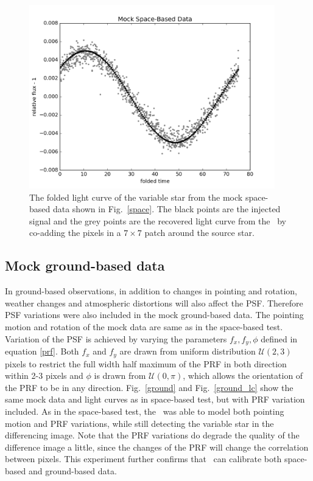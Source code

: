 \begin{figure}[p]
\begin{center}
\includegraphics[width=0.95\textwidth]{figures/cdi/f2a}
\end{center}
\caption[The light curve from \cpmdiff\ with mock space-based data]{
\label{space_lc}
 The folded light curve of the variable star from the mock space-based data shown in Fig.~\ref{space}.
 The black points are the injected signal and the grey points are the recovered light curve from the \cpmdiff\ by co-adding the pixels in a $7\times 7$ patch around the source star.
}
\end{figure}

\subsection{Mock ground-based data}
In ground-based observations, in addition to changes in pointing and rotation, weather changes and atmospheric distortions will also affect the PSF. 
Therefore PSF variations were also included in the mock ground-based data. 
The pointing motion and rotation of the mock data are same as in the space-based test.
Variation of the PSF is achieved by varying the parameters $f_x, f_y, \phi$ defined in equation \ref{prf}.
Both $f_x$ and $f_y$ are drawn from uniform distribution ${\mathcal {U}}(2,3)$ pixels to restrict the full width half maximum of the PRF in both direction within 2-3 pixels and $\phi$ is drawn from ${\mathcal {U}}(0,\pi)$, which allows the orientation of the PRF to be in any direction.
Fig.~\ref{ground} and Fig.~\ref{ground_lc} show the same mock data and light curves as in space-based test, but with PRF variation included.  
As in the space-based test, the \cpmdiff\ was able to model both pointing motion and PRF variations, while still detecting the variable star in the differencing image.
Note that the PRF variations do degrade the quality of the difference image a little, since the changes of the PRF will change the correlation between pixels.
This experiment further confirms that \cpmdiff\ can calibrate both space-based and ground-based data.

